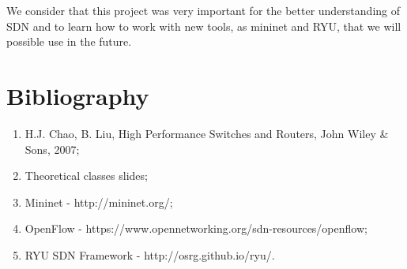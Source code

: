 \documentclass[]{report}
\begin{document}
We consider that this project was very important for the better understanding of SDN and to learn how to work with new tools, as mininet and RYU, that we will possible use in the future.


\chapter{Bibliography}
\begin{enumerate}
	\item H.J. Chao, B. Liu, High Performance Switches and Routers, John Wiley \& Sons, 2007;
	\item Theoretical classes slides;
	\item Mininet - http://mininet.org/;
	\item OpenFlow - https://www.opennetworking.org/sdn-resources/openflow;
	\item RYU SDN Framework - http://osrg.github.io/ryu/.
\end{enumerate}
\end{document}
